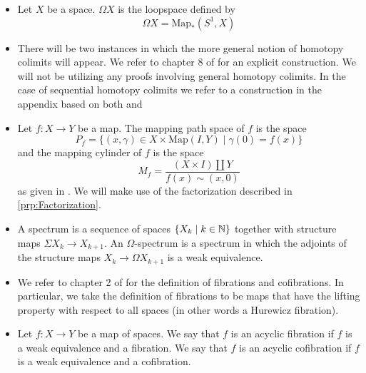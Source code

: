 \begin{itemize}
\item Let $X$ be a space. $\Omega X$ is the loopspace defined by $$\Omega X=\text{Map}_\ast(S^1,X)$$
\item There will be two instances in which the more general notion of homotopy colimits will appear. We refer to chapter 8 of \cite{CHT} for an explicit construction. We will not be utilizing any proofs involving general homotopy colimits. In the case of sequential homotopy colimits we refer to a construction in the appendix based on both \cite{CHT} and \cite{FSHT}
\item Let $f:X\to Y$ be a map. The mapping path space of $f$ is the space $$P_f=\{(x,\gamma)\in X\times\text{Map}(I,Y)\;|\;\gamma(0)=f(x)\}$$ and the mapping cylinder of $f$ is the space $$M_f=\frac{(X\times I)\amalg Y}{f(x)\sim(x,0)}$$ as given in \cite{CHT}. We will make use of the factorization described in \ref{prp:Factorization}.
\item A spectrum is a sequence of spaces $\{X_k\;|\;k\in\mathbb{N}\}$ together with structure maps $\Sigma X_k\to X_{k+1}$. An $\Omega$-spectrum is a spectrum in which the adjoints of the structure maps $X_k\to\Omega X_{k+1}$ is a weak equivalence. 
\item We refer to chapter 2 of \cite{CHT} for the definition of fibrations and cofibrations. In particular, we take the definition of fibrations to be maps that have the lifting property with respect to all spaces (in other words a Hurewicz fibration). 
\item Let $f:X\to Y$ be a map of spaces. We say that $f$ is an acyclic fibration if $f$ is a weak equivalence and a fibration. We say that $f$ is an acyclic cofibration if $f$ is a weak equivalence and a cofibration. 
\end{itemize}
